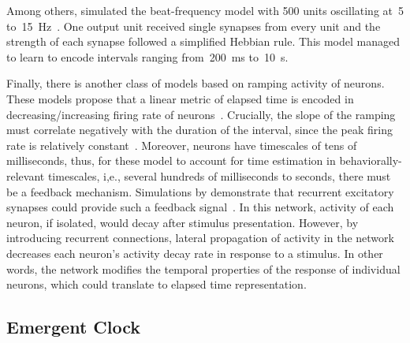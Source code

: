 Among others,  simulated the beat-frequency model with 500 units oscillating at~5 to~15~Hz~\cite{Miali1989NeuComp}.
One output unit received single synapses from every unit and the strength of each synapse followed a simplified Hebbian rule.
This model managed to learn to encode intervals ranging from~200~ms to~10~s.
\par
Finally, there is another class of models based on ramping activity of neurons.
These models propose that a linear metric of elapsed time is encoded in decreasing/increasing firing rate of neurons~\cite{Paton2018NeuronRev}.
Crucially, the slope of the ramping must correlate negatively with the duration of the interval, since the peak firing rate is relatively constant~\cite{Jazayeri2015CurrBiol}.
Moreover, neurons have timescales of tens of milliseconds, thus, for these model to account for time estimation in behaviorally-relevant timescales, i,e., several hundreds of milliseconds to seconds, there must be a feedback mechanism.
Simulations by \citeauthor{Gavornik20009PNAS} demonstrate that recurrent excitatory synapses could provide such a feedback signal~\cite{Gavornik20009PNAS}.
In this network, activity of each neuron, if isolated, would decay after stimulus presentation.
However, by introducing recurrent connections, lateral propagation of activity in the network decreases each neuron's activity decay rate in response to a stimulus.
In other words, the network modifies the temporal properties of the response of individual neurons, which could translate to elapsed time representation.




\subsection{Emergent Clock}
\label{ch:intro:InternalTimeEstimation:Emergent}

